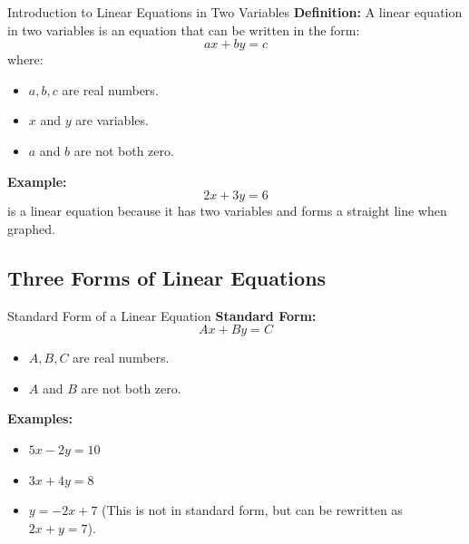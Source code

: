 \documentclass{beamer}
\begin{document}
\begin{frame}{Introduction to Linear Equations in Two Variables}
    \textbf{Definition:}  
    A linear equation in two variables is an equation that can be written in the form:
    \[
    ax + by = c
    \]
    where:
    \begin{itemize}
        \item \( a, b, c \) are real numbers.
        \item \( x \) and \( y \) are variables.
        \item \( a \) and \( b \) are not both zero.
    \end{itemize}

    \vspace{0.5cm}
    \textbf{Example:}  
    \[
    2x + 3y = 6
    \]
    is a linear equation because it has two variables and forms a straight line when graphed.
\end{frame}
\begin{frame}
\section{Three Forms of Linear Equations}
\end{frame}
\begin{frame}{Standard Form of a Linear Equation}
    \textbf{Standard Form:}  
    \[
    Ax + By = C
    \]
    \begin{itemize}
        \item \( A, B, C \) are real numbers.
        \item \( A \) and \( B \) are not both zero.
    \end{itemize}

    \vspace{0.5cm}
    \textbf{Examples:}
    \begin{itemize}
        \item \( 5x - 2y = 10 \)
        \item \( 3x + 4y = 8 \)
        \item \( y = -2x + 7 \) (This is not in standard form, but can be rewritten as \( 2x + y = 7 \)).
    \end{itemize}
\end{frame}
\end{document}
